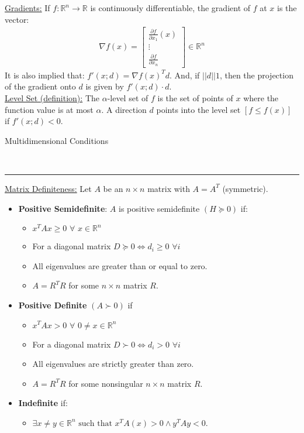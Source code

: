 \documentclass{article}
\newcommand{\header}[1]{\begin{large}\noindent #1\end{large}\\\rule{\textwidth}{0.5pt}}
\newcommand{\norm}[2]{\left\lvert\left\lvert#1\right\rvert\right\rvert}
\newcommand{\sheader}[1]{\underline{#1:}}
\newcommand{\gap}{\medskip\\}
\begin{document}
\sheader{Gradients} If $f: \mathbb{R}^n \to \mathbb{R}$ is continuously differentiable,
the gradient of $f$ at $x$ is the vector:
\begin{align*}
    \nabla f(x) = \begin{bmatrix}
        \frac{\partial f}{\partial x_1}(x) \\
        \vdots\\
        \frac{\partial f}{\partial x_n}
    \end{bmatrix}
    \in \mathbb{R}^n
\end{align*}
It is also implied that: $f'(x; d) = \nabla f(x)^T d$. And, if $\norm{d} = 1$, then the projection 
of the gradient onto $d$ is given by $f'(x;d) \cdot d$.
\gap
\sheader{Level Set (definition)} The $\alpha$-level set of $f$ is the set of points of $x$ where
the function value is at most $\alpha$. A direction $d$ points into the level set $[f \leq f(x)]$
if $f'(x;d) < 0$.
\gap
\header{Multidimensional Conditions}
\sheader{Matrix Definiteness} Let $A$ be an $n \times n$ matrix with $A = A^T$ (symmetric).
\begin{itemize}
    \item \textbf{Positive Semidefinite}: $A$ is positive semidefinite $(H \succeq 0)$ if:
    \begin{itemize}
        \item $x^T A x \geq 0 \,\, \forall \,\, x\in \mathbb{R}^n$
        \item For a diagonal matrix $D \succeq 0 \iff d_i \geq 0 \,\, \forall i$
        \item All eigenvalues are greater than or equal to zero.
        \item $A = R^TR$ for some $n \times n$ matrix $R$.
    \end{itemize}
    \item \textbf{Positive Definite} $(A \succ 0)$ if
    \begin{itemize}
        \item $x^T A x > 0 \,\, \forall \,\, 0 \neq x \in \mathbb{R}^n$
        \item For a diagonal matrix $D \succ 0 \iff d_i > 0 \,\, \forall i$
        \item All eigenvalues are strictly greater than zero.
        \item $A = R^TR$ for some nonsingular $n \times n$ matrix $R$.
    \end{itemize}
    \item \textbf{Indefinite} if:
    \begin{itemize}
        \item $\exists x \neq y \in \mathbb{R}^n \textrm{ such that } x^TA(x) > 0 \wedge y^TAy < 0$.
    \end{itemize}
\end{itemize}
\end{document}

